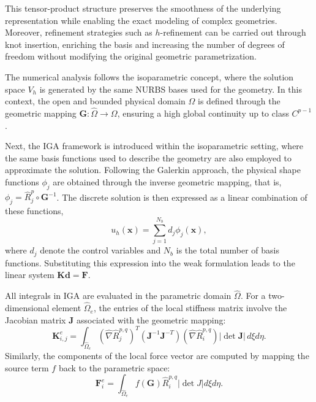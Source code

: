 \documentclass[11pt]{book}
\theoremstyle{plain} %
\theoremstyle{definition} %
\theoremstyle{definition} %
\begin{document}
This tensor-product structure preserves the smoothness of the underlying representation while enabling the exact modeling of complex geometries. Moreover, refinement strategies such as $h$-refinement can be carried out through knot insertion, enriching the basis and increasing the number of degrees of freedom without modifying the original geometric parametrization.

The numerical analysis follows the isoparametric concept, where the solution space $V_h$ is generated by the same NURBS bases used for the geometry. In this context, the open and bounded physical domain $\Omega$ is defined through the geometric mapping $\mathbf{G}: \hat{\Omega} \to \Omega$, ensuring a high global continuity up to class $C^{p-1}$.

Next, the IGA framework is introduced within the isoparametric setting, where the same basis functions used to describe the geometry are also employed to approximate the solution. Following the Galerkin approach, the physical shape functions $\phi_j$ are obtained through the inverse geometric mapping, that is, $\phi_j = \hat{R}_j^p \circ \mathbf{G}^{-1}$. The discrete solution is then expressed as a linear combination of these functions,
\begin{equation*}
    u_h(\mathbf{x}) = \sum_{j=1}^{N_b} d_j \phi_j(\mathbf{x}),
\end{equation*}
where $d_j$ denote the control variables and $N_b$ is the total number of basis functions. Substituting this expression into the weak formulation leads to the linear system $\mathbf{K}\mathbf{d} = \mathbf{F}$.

All integrals in IGA are evaluated in the parametric domain $\hat{\Omega}$. For a two-dimensional element $\hat{\Omega}_e$, the entries of the local stiffness matrix involve the Jacobian matrix $\mathbf{J}$ associated with the geometric mapping:
\begin{equation*}
    \mathbf{K}^e_{i,j} = \int_{\hat{\Omega}_e} \left(\hat{\nabla}\hat{R}_{j}^{p,q}\right)^T \left( \mathbf{J}^{-1} \mathbf{J}^{-T} \right) \left(\hat{\nabla}\hat{R}_{i}^{p,q}\right) |\det \mathbf{J}| \, d\xi d\eta.
\end{equation*}
Similarly, the components of the local force vector are computed by mapping the source term $f$ back to the parametric space:
\begin{equation*}
    \mathbf{F}^e_i=\int_{\hat{\Omega}_e}f(\mathbf{G})\hat{R}_{i}^{p,q}|\det J|d\xi d\eta.
\end{equation*}
\end{document}
